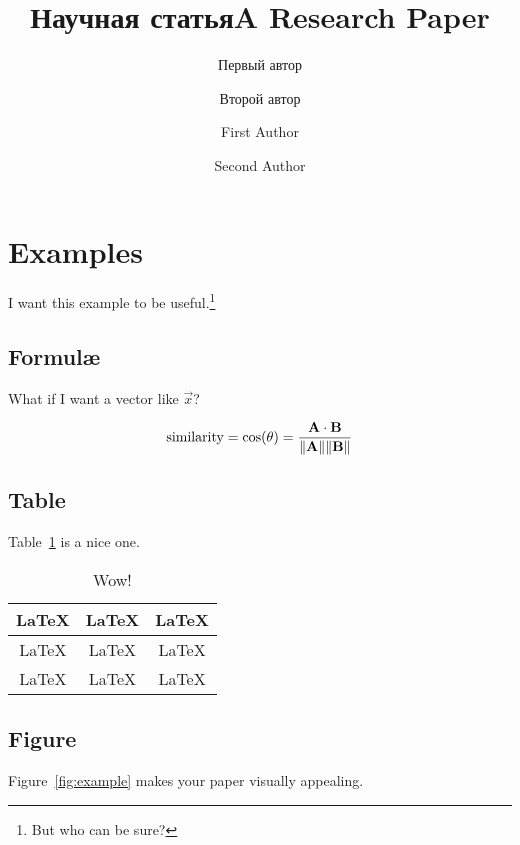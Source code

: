 \documentclass[a4paper]{article}
\date{}
\begin{document}
\title{Научная статья}
\author{Первый автор \and Второй автор}
\let\newpage\relax\maketitle

\title{A Research Paper}
\author{First Author \and Second Author}
\maketitle

\section{Examples}

I want this example to be useful.\footnote{But who can be sure?}

\subsection{Formul\ae}

What if I want a vector like $\vec{x}$?

\begin{equation}
  \text{similarity} = \cos(\theta) = {\mathbf{A} \cdot \mathbf{B} \over \|\mathbf{A}\| \|\mathbf{B}\|}
\end{equation}

\subsection{Table}

Table~\ref{tab:example} is a nice one.

\begin{table}[htbp]
\centering
\caption{\label{tab:example}Wow!}
\begin{tabular}{|c|c|c|}\hline
\LaTeX & \LaTeX & \LaTeX \\\hline
\LaTeX & \LaTeX & \LaTeX \\\hline
\LaTeX & \LaTeX & \LaTeX \\\hline
\end{tabular}
\end{table}

\subsection{Figure}

Figure~\ref{fig:example} makes your paper visually appealing.
\end{document}

